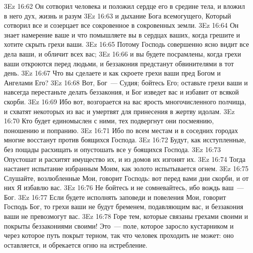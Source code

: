 \vs 3Ez 16:62 Он сотворил человека и положил сердце его в средине тела, и вложил в него дух, жизнь и разум
\vs 3Ez 16:63 и дыхание Бога всемогущего, Который сотворил все и созерцает все сокровенное в сокровенных земли.
\vs 3Ez 16:64 Он знает намерение ваше и что помышляете вы в сердцах ваших, когда грешите и хотите скрыть грехи ваши.
\vs 3Ez 16:65 Потому Господь совершенно ясно видит все дела ваши, и обличит всех вас;
\vs 3Ez 16:66 и вы будете посрамлены, когда грехи ваши откроются перед людьми, и беззакония предстанут обвинителями в тот день.
\vs 3Ez 16:67 Что вы сделаете и как скроете грехи ваши пред Богом и Ангелами Его?
\vs 3Ez 16:68 Вот, Бог~--- Судия; бойтесь Его; оставьте грехи ваши и навсегда перестаньте делать беззакония, и Бог изведет вас и избавит от всякой скорби.
\vs 3Ez 16:69 Ибо вот, возгорается на вас ярость многочисленного полчища, и схватят некоторых из вас и умертвят для принесения в жертву идолам.
\vs 3Ez 16:70 Кто будет единомыслен с ними, тех подвергнут они посмеянию, поношению и попранию.
\vs 3Ez 16:71 Ибо по всем местам и в соседних городах многие восстанут против боящихся Господа.
\vs 3Ez 16:72 Будут, как исступленные, без пощады расхищать и опустошать все у боящихся Господа.
\vs 3Ez 16:73 Опустошат и расхитят имущество их, и из домов их изгонят их.
\vs 3Ez 16:74 Тогда настанет испытание избранным Моим, как золото испытывается огнем.
\vs 3Ez 16:75 Слушайте, возлюбленные Мои, говорит Господь: вот перед вами дни скорби, и от них Я избавлю вас.
\vs 3Ez 16:76 Не бойтесь и не сомневайтесь, ибо вождь ваш~--- Бог.
\vs 3Ez 16:77 Если будете исполнять заповеди и повеления Мои, говорит Господь Бог, то грехи ваши не будут бременем, подавляющим вас, и беззакония ваши не превозмогут вас.
\vs 3Ez 16:78 Горе тем, которые связаны грехами своими и покрыты беззакониями своими! Это~--- поле, которое заросло кустарником и через которое путь покрыт терном, так что человек проходить не может: оно оставляется, и обрекается огню на истребление.
